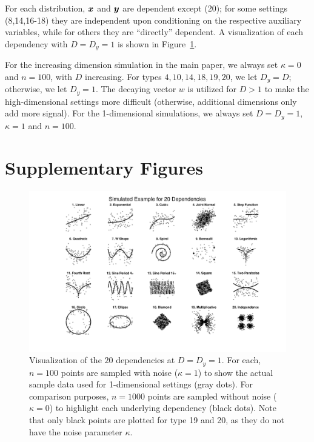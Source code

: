 \documentclass[11pt]{article}
\begin{document}
For each distribution, $\boldsymbol{x}$ and $\boldsymbol{y}$ are dependent except  (20); for some settings (8,14,16-18) they are  independent upon conditioning on the respective auxiliary variables, while for others they are
 ``directly'' dependent. 
A visualization of each dependency with $D=D_y=1$ is shown in Figure~\ref{f:dependencies}.


For the increasing dimension simulation in the main paper, we always set $\kappa=0$ and $n=100$, with $D$ increasing.  For types  $4,10,14,18,19,20$, we let $D_y=D$; otherwise, we let $D_y=1$. 
The decaying vector $w$ is utilized for $D>1$ to make the high-dimensional settings more difficult (otherwise, additional dimensions only add more signal).
For the 1-dimensional simulations, we always set $D=D_y=1$, $\kappa=1$ and $n=100$.

\clearpage




\clearpage
\section{Supplementary Figures}
\label{appen:figs}

\begin{figure}[htbp]
\includegraphics[trim={5cm 1.5cm 4cm 0.5cm},clip, width=1.0\textwidth]{Figures/FigSimVisual}
\caption{Visualization of the $20$ dependencies at $D=D_{y}=1$. For each, $n=100$ points are sampled with noise ($\kappa=1$) to show the actual sample data used for 1-dimensional settings (gray dots). For comparison purposes, $n=1000$ points are sampled without noise ($\kappa=0$) to highlight each underlying dependency (black dots). Note that only black points are plotted for type 19 and 20, as they do not have the noise parameter $\kappa$.
}
\label{f:dependencies}
\end{figure}
\end{document}
